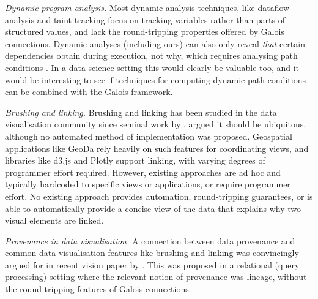 \emph{Dynamic program analysis.} Most dynamic analysis techniques, like dataflow analysis \cite{chen88,reps95} and taint tracking \cite{reps95} focus on tracking variables rather than parts of structured values, and lack the round-tripping properties offered by Galois connections. Dynamic analyses (including ours) can also only reveal \emph{that} certain dependencies obtain during execution, not why, which requires analysing path conditions \cite{hammer06}. In a data science setting this would clearly be valuable too, and it would be interesting to see if techniques for computing dynamic path conditions can be combined with the Galois framework.

\emph{Brushing and linking.} Brushing and linking has been studied in the data visualisation community since seminal work by \citet{becker87}. \citet{roberts06} argued it should be ubiquitous, although no automated method of implementation was proposed. Geospatial applications like GeoDa \cite{anselin06} rely heavily on such features for coordinating views, and libraries like d3.js and Plotly support linking, with varying degrees of programmer effort required. However, existing approaches are ad hoc and typically hardcoded to specific views or applications, or require programmer effort. No existing approach provides automation, round-tripping guarantees, or is able to automatically provide a concise view of the data that explains why two visual elements are linked.

\emph{Provenance in data visualisation.} A connection between data provenance and common data visualisation features like brushing and linking was convincingly argued for in recent vision paper by \citet{psallidas18}. This was proposed in a relational (query processing) setting where the relevant notion of provenance was lineage, without the round-tripping features of Galois connections.
